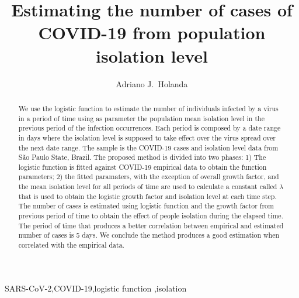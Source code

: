 \documentclass[review]{elsarticle}
\begin{document}
\begin{frontmatter}

\title{Estimating the number of cases of {COVID-19} from population isolation level}

\author[mymainaddress,mysecondaryaddress]{Adriano J.\ Holanda}

\address[mymainaddress]{Department of Computing and Mathematics - Faculty of Philosophy, Science and Letters at Ribeir\~{a}o Preto - University of S\~{a}o Paulo, Ribeirão Preto, S\~{a}o Paulo, Brazil}
\address[mysecondaryaddress]{Faculty ``Dr.\ Francisco Maeda'', Ituverava, São Paulo, Brazil}


\begin{abstract}
We use the logistic function to estimate the number 
of individuals infected by a virus in a period of time
using as parameter the population mean isolation level 
in the previous period of the infection occurrences.
Each period is composed by a date range in days 
where the isolation level is supposed to take
effect over the virus spread over the next 
date range.
The sample is the \hbox{COVID-19} cases and 
isolation level data from S\~{a}o Paulo State, Brazil.  
The proposed method is divided into two phases: 
1) The logistic function is fitted against \hbox{COVID-19}
empirical data to obtain the function parameters; 
2) the fitted paramaters, 
with the exception of overall growth factor,
 and the mean isolation level for all periods of time 
are used to calculate a constant called $\lambda$ 
that is used to obtain the logistic growth factor and
 isolation level at each time step.
 The number of cases is estimated using 
logistic function and the growth factor 
from previous period of time 
to obtain the effect of people isolation during the
elapsed time. 
The period of time that produces a 
better correlation between empirical and estimated 
number of cases is 5 days. 
We conclude the method produces a good 
estimation when correlated with the empirical data.
\end{abstract}

\begin{keyword}
\hbox{SARS-CoV-2}\sep \hbox{COVID-19}\sep logistic function \sep isolation
\end{keyword}

\end{frontmatter}
\end{document}
